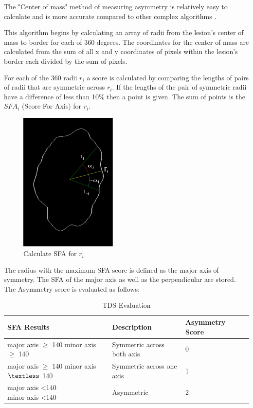 The "Center of mass" method of measuring asymmetry is relatively easy to calculate and is more accurate compared to other complex algorithms \cite{Premaladha_2014}.

This algorithm begins by calculating an array of radii from the lesion's center of mass to border for each of 360 degrees. The coordinates for the center of mass are calculated from the sum of all x and y coordinates of pixels within the lesion's border each divided by the sum of pixels.

For each of the 360 radii $r_i$ a score is calculated by comparing the lengths of pairs of radii that are symmetric across $r_i$. If the lengths of the pair of symmetric radii have a difference of less than 10\% then a point is given. The sum of points is the $SFA_i$ (Score For Axis) for $r_i$.

\begin{figure}[H]
    \centering
    \includegraphics[height=7cm,keepaspectratio]{assets/assymertry/asymmetry_01.pdf}
    \caption{Calculate SFA for $r_i$}
    \label{fig:sfa}
\end{figure}


 The radius with the maximum SFA score is defined as the major axis of symmetry. The SFA of the major axis as well as the perpendicular are stored. The Asymmetry score is evaluated as follows:


\begin{table}[H]
\centering
\small
    \begin{tabular}{ | l | p{3.5cm} | l | p{3.5cm} |}
    \hline
    SFA Results & Description & Asymmetry Score \\ \hline
    \specialcell[t]{major axis $\geq$ 140 \\ minor axis $\geq$ 140} & Symmetric across both axis & 0  \\ \hline
    \specialcell[t]{major axis $\geq$ 140 \\ minor axis $\textless$ 140} & Symmetric across one axis & 1  \\ \hline
    \specialcell[t]{major axis \textless 140 \\ minor axis \textless 140} & Asymmetric & 2  \\ \hline


    \end{tabular}

    \caption{TDS Evaluation\cite{Weigert_2012}}
    \label{fig:tds_eval}

\end{table}